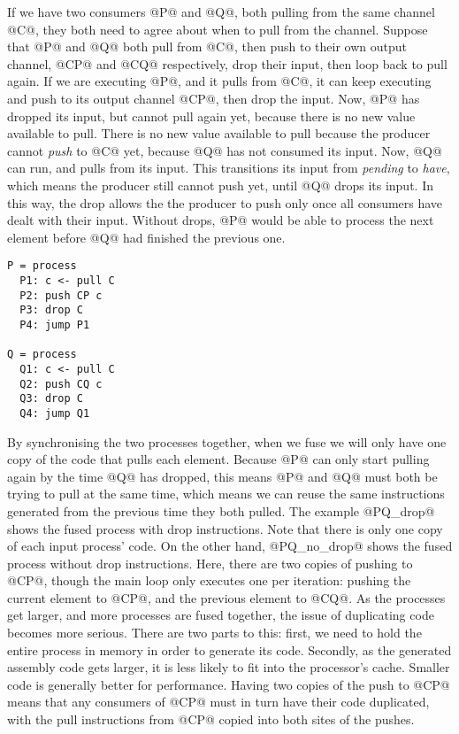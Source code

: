 If we have two consumers @P@ and @Q@, both pulling from the same channel @C@, they both need to agree about when to pull from the channel.
Suppose that @P@ and @Q@ both pull from @C@, then push to their own output channel, @CP@ and @CQ@ respectively, drop their input, then loop back to pull again.
If we are executing @P@, and it pulls from @C@, it can keep executing and push to its output channel @CP@, then drop the input.
Now, @P@ has dropped its input, but cannot pull again yet, because there is no new value available to pull.
There is no new value available to pull because the producer cannot \emph{push} to @C@ yet, because @Q@ has not consumed its input.
Now, @Q@ can run, and pulls from its input.
This transitions its input from \emph{pending} to \emph{have}, which means the producer still cannot push yet, until @Q@ drops its input.
In this way, the drop allows the the producer to push only once all consumers have dealt with their input.
Without drops, @P@ would be able to process the next element before @Q@ had finished the previous one.

\begin{lstlisting}
P = process
  P1: c <- pull C
  P2: push CP c
  P3: drop C
  P4: jump P1

Q = process
  Q1: c <- pull C
  Q2: push CQ c
  Q3: drop C
  Q4: jump Q1
\end{lstlisting}

By synchronising the two processes together, when we fuse we will only have one copy of the code that pulls each element.
Because @P@ can only start pulling again by the time @Q@ has dropped, this means @P@ and @Q@ must both be trying to pull at the same time, which means we can reuse the same instructions generated from the previous time they both pulled.
The example @PQ_drop@ shows the fused process with drop instructions.
Note that there is only one copy of each input process' code.
On the other hand, @PQ_no_drop@ shows the fused process without drop instructions.
Here, there are two copies of pushing to @CP@, though the main loop only executes one per iteration: pushing the current element to @CP@, and the previous element to @CQ@.
As the processes get larger, and more processes are fused together, the issue of duplicating code becomes more serious.
There are two parts to this: first, we need to hold the entire process in memory in order to generate its code.
Secondly, as the generated assembly code gets larger, it is less likely to fit into the processor's cache.
Smaller code is generally better for performance.
Having two copies of the push to @CP@ means that any consumers of @CP@ must in turn have their code duplicated, with the pull instructions from @CP@ copied into both sites of the pushes.

